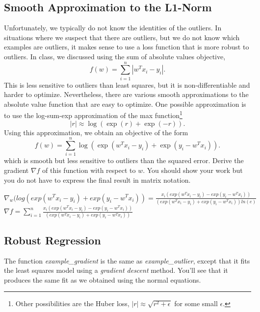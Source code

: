 \documentclass{article}
\def\blu#1{{\color{blu}#1}}
\begin{document}
\subsection{Smooth Approximation to the L1-Norm}

Unfortunately, we typically do not know the identities of the outliers. In situations where we suspect that there are outliers, but we do not know which examples are outliers, it makes sense to use a loss function that is more robust to outliers. In class, we discussed using the sum of absolute values objective,
\[
f(w) = \sum_{i=1}^n |w^Tx_i - y_i|.
\]
This is less sensitive to outliers than least squares, but it is non-differentiable and harder to optimize. Nevertheless, there are various smooth approximations to the absolute value function that are easy to optimize. One possible approximation is to use the log-sum-exp approximation of the max function\footnote{Other possibilities are the Huber loss, $|r| \approx \sqrt{r^2 + \epsilon}$ for some small $\epsilon$.}
\[
|r| \approx \log(\exp(r) + \exp(-r)).
\]
Using this approximation, we obtain an objective of the form
\[
f(w) = \sum_{i=1}^n  \log\left(\exp(w^Tx_i - y_i) + \exp(y_i - w^Tx_i)\right).
\]
which is smooth but less sensitive to outliers than the squared error. \blu{Derive
 the gradient $\nabla f$ of this function with respect to $w$. You should show your work but you do not have to express the final result in matrix notation.}

$\nabla _w(log(exp(w^Tx_i-y_i)+exp(y_i-w^Tx_i))= \frac{x_i(exp(w^Tx_i-y_i)-exp(y_i-w^Tx_i))}{(exp(w^Tx_i-y_i)+exp(y_i-w^Tx_i))ln(e)}$\\
$\nabla f= \sum\limits_{i=1}^{n}\frac{x_i(exp(w^Tx_i-y_i)-exp(y_i-w^Tx_i))}{(exp(w^Tx_i-y_i)+exp(y_i-w^Tx_i))}$

\subsection{Robust Regression}

The function \emph{example\_gradient} is the same as \emph{example\_outlier}, except that it fits the least squares model using a \emph{gradient descent} method. You'll see that it produces the same fit as we obtained using the normal equations.
\end{document}

